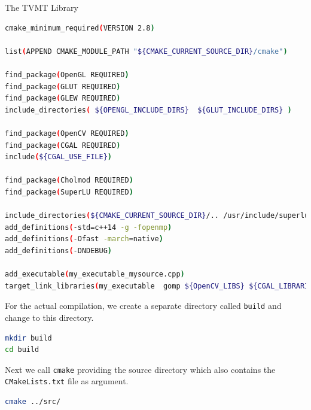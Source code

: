 \begin{chapter}{The TVMT Library}
\begin{lstlisting}[language=bash,label=code:cmake_example,caption={Example CMakeLists.txt}]
cmake_minimum_required(VERSION 2.8)

list(APPEND CMAKE_MODULE_PATH "${CMAKE_CURRENT_SOURCE_DIR}/cmake")

find_package(OpenGL REQUIRED)
find_package(GLUT REQUIRED)
find_package(GLEW REQUIRED)
include_directories( ${OPENGL_INCLUDE_DIRS}  ${GLUT_INCLUDE_DIRS} )

find_package(OpenCV REQUIRED)
find_package(CGAL REQUIRED)
include(${CGAL_USE_FILE})

find_package(Cholmod REQUIRED)
find_package(SuperLU REQUIRED)

include_directories(${CMAKE_CURRENT_SOURCE_DIR}/.. /usr/include/superlu /usr/include/eigen3 $ENV{HOME}/projects/iod)
add_definitions(-std=c++14 -g -fopenmp)
add_definitions(-Ofast -march=native)
add_definitions(-DNDEBUG)

add_executable(my_executable_mysource.cpp)
target_link_libraries(my_executable  gomp ${OpenCV_LIBS} ${CGAL_LIBRARIES} ${CHOLMOD_LIBRARIES} ${SUPERLU_LIBRARIES} ${OPENGL_LIBRARIES} ${GLUT_LIBRARY} ${GLEW_LIBRARIES})
\end{lstlisting}

For the actual compilation, we create a separate directory called \texttt{build} and change to this directory.
\begin{lstlisting}[language=bash]
mkdir build
cd build
\end{lstlisting}

Next we call \texttt{cmake} providing the source directory which also contains the \texttt{CMakeLists.txt} file as argument.
\begin{lstlisting}[language=bash]
cmake ../src/
\end{lstlisting}


\end{chapter}
